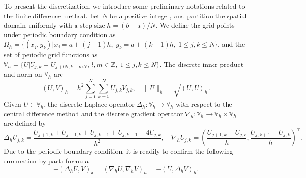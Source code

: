 \documentclass[fleqn,11pt]{elsarticle}
\numberwithin{equation}{section}
\begin{document}
To present the discretization, we introduce some preliminary notations related to the finite difference method. Let $N$ be a positive integer, and partition the spatial domain uniformly with a step size $h = (b-a)/N$. We define the grid points under periodic boundary condition as $\Omega_h = \{ (x_j, y_k)| x_j = a + (j-1) h, \ y_k = a + (k-1) h, \ 1 \leq j,k \leq N \}$, and the set of periodic grid functions as $\mathbb{V}_h = \{ U| U_{j,k} = U_{j+lN, k+mN}, \ l, m \in \mathbb{Z}, \ 1\leq j,k \leq N   \}$. The discrete inner product and norm on $\mathbb{V}_h$ are
\begin{equation*}
	(U, V)_h = h^2 \sum\limits_{j = 1}^{N} \sum\limits_{k=1}^{N} U_{j,k} \overline{V}_{j,k}, \quad  \|U\|_h = \sqrt{(U, U)_h}.
\end{equation*}
Given $U \in \mathbb{V}_h$, the discrete Laplace operator $\Delta_h : \mathbb{V}_h \to \mathbb{V}_h$ with respect to the central difference method and the discrete gradient operator $\nabla_h: \mathbb{V}_h \to \mathbb{V}_h \times \mathbb{V}_h$  are defined by
\begin{equation*}
	\Delta_h U_{j,k} = \frac{U_{j+1, k} + U_{j-1, k} + U_{j, k+1} + U_{j,k-1} - 4 U_{j,k}}{h^2}, \quad \nabla_h U_{j,k} = \left( \frac{U_{j+1,k} - U_{j,k}}{h}, \frac{U_{j,k+1} - U_{j,k}}{h} \right)^\top.
\end{equation*}
Due to the periodic boundary condition, it is readily to confirm the following summation by parts formula
\begin{equation*}
	- (\Delta_h U, V)_h = (\nabla_h U, \nabla_h V)_h = -(U, \Delta_h V)_h.
\end{equation*}
\end{document}
